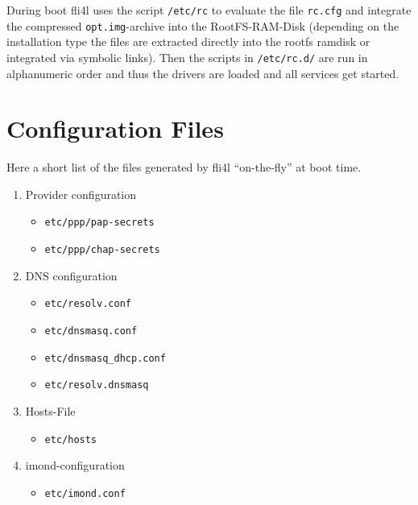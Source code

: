 During boot fli4l uses the script \texttt{/etc/rc} to evaluate the file \texttt{rc.cfg} and
integrate the compressed \texttt{opt.img}-archive into the RootFS-RAM-Disk (depending on
the installation type the files are extracted directly into the rootfs ramdisk or integrated
via symbolic links).
Then the scripts in \texttt{/etc/rc.d/} are run in alphanumeric order and thus the drivers
are loaded and all services get started.

\section{Configuration Files}

Here a short list of the files generated  by fli4l
``on-the-fly'' at boot time.

\begin{enumerate}
\item Provider configuration
  \begin{itemize}
  \item         \texttt{etc/ppp/pap-secrets}

  \item         \texttt{etc/ppp/chap-secrets}

  \end{itemize}
\item DNS configuration
  \begin{itemize}
  \item         \texttt{etc/resolv.conf}

  \item         \texttt{etc/dnsmasq.conf}

  \item         \texttt{etc/dnsmasq\_dhcp.conf}

  \item         \texttt{etc/resolv.dnsmasq}

  \end{itemize}


\item Hosts-File
  \begin{itemize}
  \item         \texttt{etc/hosts}
  \end{itemize}



\item imond-configuration
  \begin{itemize}
  \item \texttt{etc/imond.conf}
  \end{itemize}

\end{enumerate}


